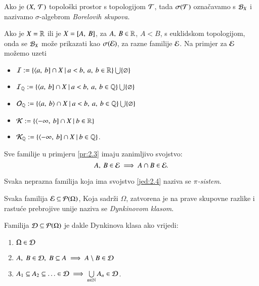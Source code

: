 \begin{defn}
    Ako je $(X, \: \mathcal{T})$ topolo\v ski prostor s topologijom $\mathcal{T}$, tada $\sigma({\mathcal{T}})$ ozna\v cavamo s $\mathcal{B}_{X}$ i nazivamo $\sigma$-algebrom \emph{Borelovih skupova}.        
\end{defn}

\begin{pr}  \label{pr:2.3}
    Ako je $X = \mathbb{R}$ ili je $X = [{A}, \:{B}]$, za $A, \: B \in \mathbb{R}$, $A < B$, s euklidskom topologijom, onda se $\mathcal{B}_{X}$ mo\v ze prikazati kao $\sigma({\mathcal{E}})$, za razne familije $\mathcal{E}$.
    Na primjer za $\mathcal{E}$ mo\v zemo uzeti
    \begin{itemize}
        \item $\mathcal{I} := \{{\langle {a}, \: {b}] \cap X} \: | \: {a < b, \:
            a, \: b \in \mathbb{R}}\} \bigcup \{\varnothing\}$
        \item $\mathcal{I}_{\mathbb{Q}} := \{{\langle {a}, \: {b}] \cap X} \: | \: {a < b,
            \: a, \: b \in \mathbb{Q}}\} \bigcup \{ \varnothing \}$
        \item $\mathcal{O}_{\mathbb{Q}} := \{{\langle {a}, \: {b} \rangle \cap X} \: | \: {a < b,
            \: a, \: b \in \mathbb{Q}}\} \bigcup \{ \varnothing \}$
        \item $\mathcal{K} := \{{\langle {-\infty}, \: {b}] \cap X} \: | \: {b
            \in \mathbb{R}}\}$
        \item $\mathcal{K}_{\mathbb{Q}} := \{{\langle {-\infty}, \: {b}]
            \cap X} \: | \: {b \in \mathbb{Q}}\}$.
    \end{itemize}
\end{pr}

Sve familije u primjeru \ref{pr:2.3} imaju zanimljivo svojstvo:
\begin{equation}    \label{jed:2.4}
    A, \: B \in \mathcal{E} \implies A \cap B \in \mathcal{E}.
\end{equation}

Svaka neprazna familija koja ima svojstvo \eqref{jed:2.4} naziva se \emph{$\pi$-sistem}.

Svaka familija $\mathcal{E} \subseteq \mathcal{P}({\Omega})$, Koja sadr\v zi $\Omega$, zatvorena je na prave skupovne razlike i rastu\' ce prebrojive unije naziva se \emph{Dynkinovom klasom}.

\begin{nap}
    Familija $\mathcal{D} \subseteq \mathcal{P}({\Omega})$ je dakle Dynkinova klasa ako vrijedi:
    \begin{enumerate}[label=(\roman*)]
        \item $\Omega \in \mathcal{D}$
        \item $A, \; B \in \mathcal{D}, \; B \subseteq A \implies A \setminus B \in \mathcal{D}$
        \item $A_1 \subseteq A_2 \subseteq \ldots \in \mathcal{D} \implies \bigcup\limits_{n \in \mathbb{N}}^{} A_n \in \mathcal{D}$.
    \end{enumerate} 
\end{nap}

